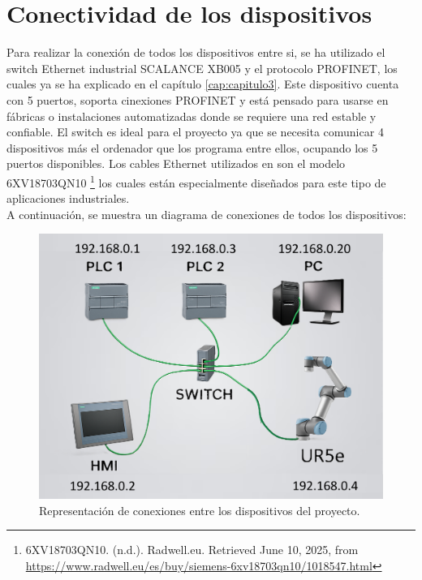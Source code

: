 \section{Conectividad de los dispositivos}
\label{sec:conectividad_dispositivos}

Para realizar la conexión de todos los dispositivos entre si, se ha utilizado el switch Ethernet industrial SCALANCE XB005 y el protocolo PROFINET, los cuales ya se ha explicado en el capítulo \ref{cap:capitulo3}. Este dispositivo cuenta con 5 puertos, soporta cinexiones PROFINET y está pensado para usarse en fábricas o instalaciones automatizadas donde se requiere una red estable y confiable. El switch es ideal para el proyecto ya que se necesita comunicar 4 dispositivos más el ordenador que los programa entre ellos, ocupando los 5 puertos disponibles. Los cables Ethernet utilizados en son el modelo 6XV18703QN10 \footnote{6XV18703QN10. (n.d.). Radwell.eu. Retrieved June 10, 2025, from \url{https://www.radwell.eu/es/buy/siemens-6xv18703qn10/1018547.html}} los cuales están especialmente diseñados para este tipo de aplicaciones industriales.  \\

A continuación, se muestra un diagrama de conexiones de todos los dispositivos:

\begin{figure} [h!]
  \begin{center}
    \includegraphics[width=14cm]{figs/conexion_dispositivos}
  \end{center}
  \caption{\centering Representación de conexiones entre los dispositivos del proyecto.}
  \label{fig:conexion_dispositivos}
\end{figure} 


